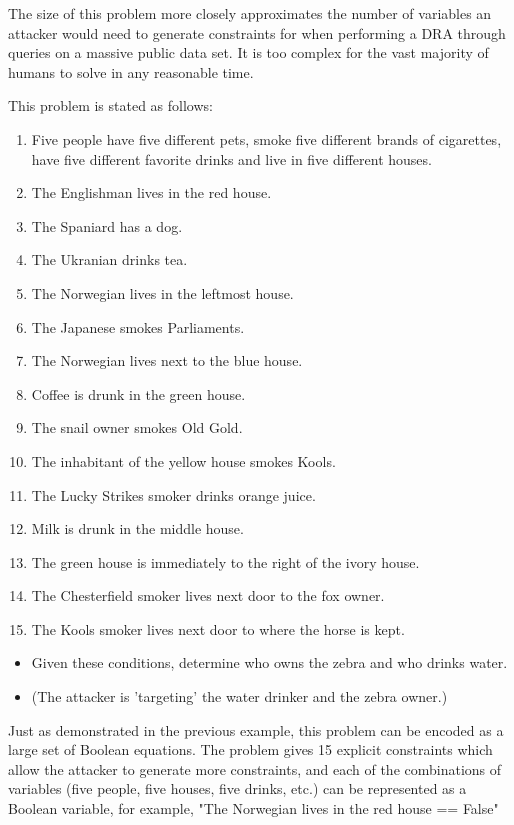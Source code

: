 \documentclass[jou,apacite]{apa6}
\begin{document}
The size of this problem more closely approximates the number
of variables an attacker would need to generate constraints for when performing a DRA through queries on a massive public data set. It is too complex for the vast majority of humans to solve in any reasonable time.

This problem is stated as follows:

\begin{enumerate}
\item Five people have five different pets, smoke five different
       brands of cigarettes, have five different favorite drinks and
       live in five different houses.
\item The Englishman lives in the red house.
\item The Spaniard has a dog.
\item The Ukranian drinks tea.
\item The Norwegian lives in the leftmost house.
\item The Japanese smokes Parliaments.
\item The Norwegian lives next to the blue house.
\item Coffee is drunk in the green house.
\item The snail owner smokes Old Gold.
\item The inhabitant of the yellow house smokes Kools.
\item The Lucky Strikes smoker drinks orange juice.
\item Milk is drunk in the middle house.
\item The green house is immediately to the right of the ivory house.
\item The Chesterfield smoker lives next door to the fox owner.
\item The Kools smoker lives next door to where the horse is kept.
\end{enumerate}


\begin{itemize}
\item Given these conditions, determine who owns the zebra and who drinks water.
\item (The attacker is 'targeting' the water drinker and the zebra owner.)
\end{itemize}

Just as demonstrated in the previous example, this problem
can be encoded as a large set of Boolean equations. The problem
gives 15 explicit constraints which allow the attacker to generate more constraints, and each of the combinations of variables (five people, five houses, five drinks, etc.) can be represented as a Boolean variable, for example, "The Norwegian lives in the red house == False"
\end{document}
